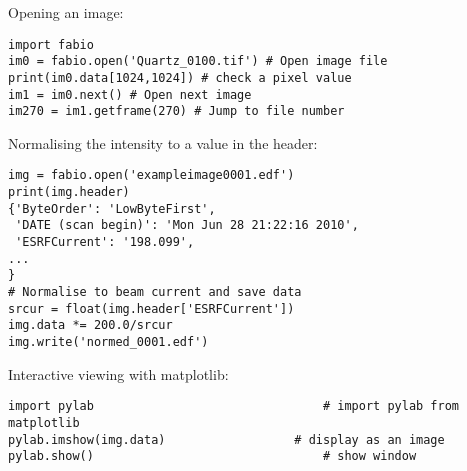 \documentclass{iucr}
\begin{document}
Opening an image:

\begin{verbatim}
import fabio     
im0 = fabio.open('Quartz_0100.tif') # Open image file
print(im0.data[1024,1024]) # check a pixel value
im1 = im0.next() # Open next image
im270 = im1.getframe(270) # Jump to file number
\end{verbatim}

Normalising the intensity to a value in the header:

\begin{verbatim}
img = fabio.open('exampleimage0001.edf')
print(img.header)
{'ByteOrder': 'LowByteFirst',
 'DATE (scan begin)': 'Mon Jun 28 21:22:16 2010',
 'ESRFCurrent': '198.099',
...
}
# Normalise to beam current and save data
srcur = float(img.header['ESRFCurrent'])
img.data *= 200.0/srcur
img.write('normed_0001.edf')
\end{verbatim}

Interactive viewing with matplotlib:

\begin{verbatim}
import pylab								# import pylab from matplotlib
pylab.imshow(img.data)					# display as an image
pylab.show()								# show window
\end{verbatim}



\end{document}
